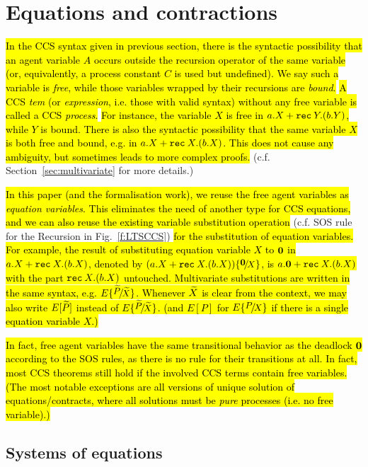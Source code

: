 \section{Equations and contractions}
\label{s:eq}

\hl{In the CCS syntax given in previous section, there is the syntactic
possibility that an agent variable $A$ occurs
outside the recursion operator of the same variable (or, equivalently, a
process constant $C$ is used but undefined). We say such a variable is
\emph{free}, while those variables wrapped by their recursions are
\emph{bound}.}
\hl{A CCS \emph{tem} (or \emph{expression}, i.e. those with valid syntax)
without any free variable is called a CCS \emph{process}.}
\hl{For instance, the variable $X$ is free in $a.X + {\tt rec}\: Y . (b.Y)$, while $Y$
is bound. There is also the syntactic possibility that the same
variable $X$ is
both free and bound, e.g. in $a.X + {\tt rec}\: X . (b.X)$.
This does not cause any ambiguity, but sometimes leads to more
complex proofs.} (c.f. Section~\ref{sec:multivariate} for more details.)

\hl{In this paper (and the formalisation work), we reuse the free agent
variables as \emph{equation variables}. This eliminates the need of
another type for CCS equations, and we can also reuse the existing
variable substitution operation} (c.f. SOS rule for the Recursion in
Fig.~\ref{f:LTSCCS}) \hl{for the substitution of equation variables.
For example, the result of substituting equation variable $X$ to ${\boldsymbol 0}$ in $a.X +
{\tt rec}\: X . (b.X)$, denoted by $(a.X + \recu X (b.X)) \sub {\nil} X$, is
$a.{\boldsymbol 0} + {\tt rec}\: X . (b.X)$ with the part ${\tt rec}\: X . (b.X)$
untouched. Multivariate substitutions are written in the same syntax,
e.g. $E \sub {\til P} {\til X}$. Whenever $\widetilde X$ is clear from the
context, we may also write $E[\widetilde P]$ instead of $E \sub {\til P} {\til
  X}$. (and $E[P]$ for $E \sub P X$ if there is a single equation variable $X$.)}

\hl{In fact, free agent variables have the same transitional behavior
as the deadlock ${\boldsymbol 0}$ according to the SOS rules, as there is
no rule for their transitions at all. In fact, most CCS theorems still hold if
the involved CCS terms contain free variables. (The most notable
exceptions are all versions of unique solution of equations/contracts,
where all solutions must be \emph{pure} processes (i.e. no free variable).)}

\subsection{Systems of equations}
\label{ss:SysEq}

